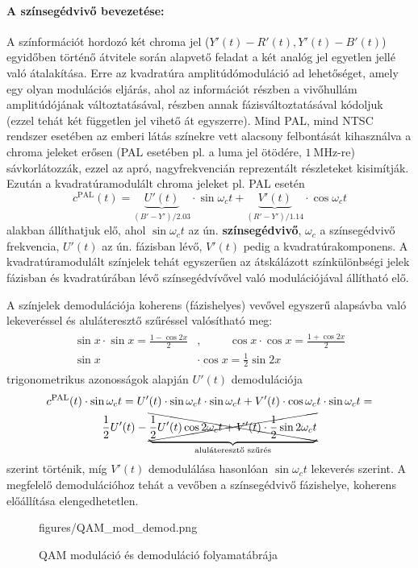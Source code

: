 \paragraph{A színsegédvivő bevezetése:}
A színformációt hordozó két chroma jel ($Y'(t)-R'(t), Y'(t)-B'(t)$) egyidőben történő átvitele során alapvető feladat a két analóg jel egyetlen jellé való átalakítása.
Erre az kvadratúra amplitúdómoduláció ad lehetőséget, amely egy olyan modulációs eljárás, ahol az információt részben a vivőhullám amplitúdójának változtatásával, részben annak fázisváltoztatásával kódoljuk (ezzel tehát két független jel vihető át egyszerre). 
Mind PAL, mind NTSC rendszer esetében az emberi látás színekre vett alacsony felbontását kihasználva a chroma jeleket erősen (PAL esetében pl. a luma jel ötödére, $1~\mathrm{MHz}$-re) sávkorlátozzák, ezzel az apró, nagyfrekvencián reprezentált részleteket kisimítják. 
Ezután a kvadratúramodulált chroma jeleket pl. PAL esetén
\begin{equation}
c^{\mathrm{PAL}}(t) = \underbrace{U'(t)}_{\left( B'- Y'\right) / 2.03} \cdot \sin \omega_c t + \underbrace{V'(t)}_{\left( R'- Y'\right) / 1.14}  \cdot \cos \omega_c t
\label{Eq:PAL_cr}
\end{equation}
alakban állíthatjuk elő, ahol $\sin \omega_c t$ az ún. \textbf{színsegédvivő}, $\omega_c$ a színsegédvivő frekvencia, $U'(t)$ az ún. fázisban lévő, $V'(t)$ pedig a kvadratúrakomponens.
A kvadratúramodulált színjelek tehát egyszerűen az átskálázott színkülönbségi jelek fázisban és kvadratúrában lévő színsegédvívővel való modulációjával állítható elő.

A színjelek demodulációja koherens (fázishelyes) vevővel egyszerű alapsávba való lekeveréssel és aluláteresztő szűréssel valósítható meg:
\begin{align}
\begin{split}
\sin x \cdot \sin x = \frac{1-\cos 2x}{2}&,\hspace{1cm}
\cos x \cdot \cos x = \frac{1+\cos 2x}{2} \\
\sin x &\cdot \cos x = \frac{1}{2}\sin 2x
\end{split}
\end{align}
trigonometrikus azonosságok alapján $U'(t)$ demodulációja
\begin{multline}
c^{\mathrm{PAL}}(t)\cdot \sin \omega_c t = U'(t)\cdot \sin \omega_c t\cdot \sin \omega_c t + V'(t) \cdot \cos \omega_c t  \cdot	\sin \omega_c t = \\
\frac{1}{2} U'(t) -
\underbrace{ \xcancel{ \frac{1}{2} U'(t)\cos 2 \omega_c t  + V'(t) \cdot \frac{1}{2}\sin 2 \omega_c t }}_{\text{aluláteresztő szűrés}}
\end{multline}
szerint történik, míg $V'(t)$ demodulálása hasonlóan $\sin \omega_c t$ lekeverés szerint.
A megfelelő demodulációhoz tehát a vevőben a színsegédvivő fázishelye, koherens előállítása elengedhetetlen.
\begin{figure}[]
	\centering
	\hspace{4mm}
	\begin{overpic}[width = 0.90\columnwidth ]{figures/QAM_mod_demod.png}
	\end{overpic}
	\caption{QAM moduláció és demoduláció folyamatábrája}
	\label{Fig:QAM_mod_demod}
\end{figure}

